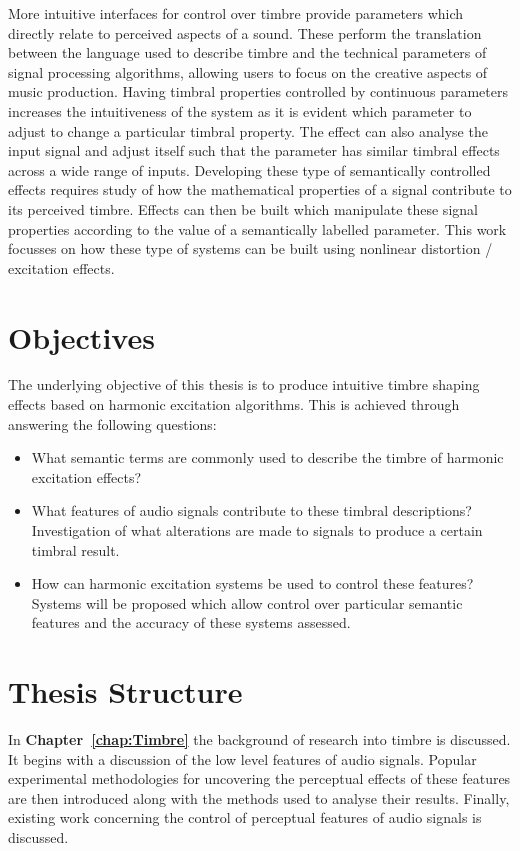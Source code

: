 	More intuitive interfaces for control over timbre provide parameters which directly relate to perceived aspects of a
	sound. These perform the translation between the language used to describe timbre and the technical parameters of
	signal processing algorithms, allowing users to focus on the creative aspects of music production. Having timbral
	properties controlled by continuous parameters increases the intuitiveness of the system as it is evident which
	parameter to adjust to change a particular timbral property. The effect can also analyse the input signal and adjust
	itself such that the parameter has similar timbral effects across a wide range of inputs. Developing these type of
	semantically controlled effects requires study of how the mathematical properties of a signal contribute to its
	perceived timbre. Effects can then be built which manipulate these signal properties according to the value of a
	semantically labelled parameter. This work focusses on how these type of systems can be built using nonlinear
	distortion / excitation effects.

\section{Objectives}
\label{sec:Introduction-Objectives}
	The underlying objective of this thesis is to produce intuitive timbre shaping effects based on harmonic excitation
	algorithms. This is achieved through answering the following questions:

	\begin{itemize}
		\item What semantic terms are commonly used to describe the timbre of harmonic excitation effects? 
		\item What features of audio signals contribute to these timbral descriptions? Investigation of what
		      alterations are made to signals to produce a certain timbral result.
		\item How can harmonic excitation systems be used to control these features? Systems will be proposed which
		      allow control over particular semantic features and the accuracy of these systems assessed.
	\end{itemize}

\section{Thesis Structure}
\label{sec:Introduction-ThesisStructure}
	In {\bf{Chapter~\ref{chap:Timbre}}} the background of research into timbre is discussed. It begins with a discussion
	of the low level features of audio signals. Popular experimental methodologies for uncovering the perceptual effects
	of these features are then introduced along with the methods used to analyse their results. Finally, existing work
	concerning the control of perceptual features of audio signals is discussed.

